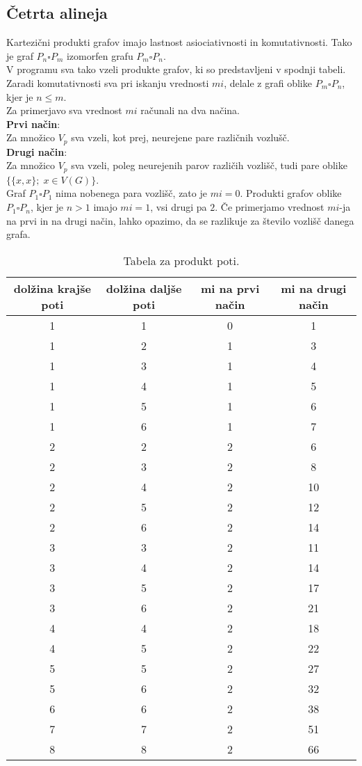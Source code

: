 \documentclass[a4paper]{article}
\begin{document}
\subsection{Četrta alineja}
Kartezični produkti grafov imajo lastnost asiociativnosti in komutativnosti. Tako je graf $P_n \square P_m$  izomorfen grafu $P_m \square P_n$.\\
V programu sva tako vzeli produkte grafov, ki so predstavljeni v spodnji tabeli. Zaradi komutativnosti sva pri iskanju vrednosti $mi$, delale z grafi oblike $P_m \square P_n$, kjer je $n \leq m$.\\
Za primerjavo sva vrednost $mi$ računali na dva načina.\\
\textbf{Prvi način}:\\
Za množico $V_p$ sva vzeli, kot prej, neurejene pare različnih vozlušč.\\
\textbf{Drugi način}:\\
Za množico $V_p$ sva vzeli, poleg neurejenih parov različih vozlišč, tudi pare oblike $\{\{x,x\};\; x \in V(G)\}$.\\
Graf $P_1 \square P_1$ nima nobenega para vozlišč, zato je $mi=0.$ Produkti grafov oblike $P_1 \square P_n$, kjer je $n>1$ imajo $mi=1$, vsi drugi pa $2$.
Če primerjamo vrednost $mi$-ja na prvi in na drugi način, lahko opazimo, da se razlikuje za število vozlišč danega grafa.
\begin{table}[h!]
\centering
\begin{tabular}{||c c c c||} 
 \hline
 dolžina krajše poti & dolžina daljše poti & mi na prvi način & mi na drugi način \\ [0.5ex] 
 \hline\hline
 1 & 1 & 0 & 1 \\ 
 1 & 2 & 1 & 3 \\
 1 & 3 & 1 & 4 \\
 1 & 4 & 1 & 5 \\
 1 & 5 & 1 & 6 \\
 1 & 6 & 1 & 7 \\ 
 \hline 
 2 & 2 & 2 & 6  \\
 2 & 3 & 2 & 8  \\
 2 & 4 & 2 & 10  \\
 2 & 5 & 2 & 12  \\
 2 & 6 & 2 & 14  \\ 
 \hline
 3 & 3 & 2 & 11 \\
 3 & 4 & 2 & 14 \\
 3 & 5 & 2 & 17 \\
 3 & 6 & 2 & 21 \\ 
 \hline
 4 & 4 & 2 & 18 \\
 4 & 5 & 2 & 22 \\
 \hline
 5 & 5 & 2 & 27 \\
 5 & 6 & 2 & 32 \\ 
 \hline
 6 & 6 & 2 & 38\\
 \hline
 7 & 7 & 2 & 51 \\
 \hline
 8 & 8 & 2 & 66 \\
 \hline
\end{tabular}
\caption{Tabela za produkt poti.}
\label{table:1}
\end{table}
\end{document}
